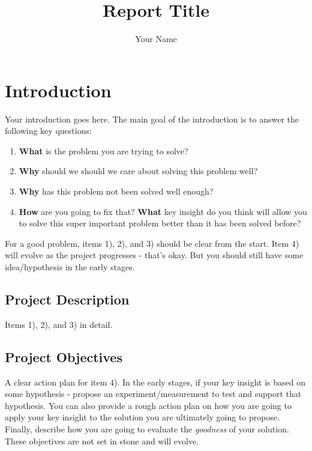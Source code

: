 \documentclass[hyp]{socreport}
\begin{document}
\title{Report Title}
\author{Your Name}

\maketitle

\tableofcontents 

\chapter{Introduction}
\label{intro}

Your introduction goes here. The main goal of the introduction is to answer the following key questions:
\begin{enumerate}
    \item \textbf{What} is the problem you are trying to solve?
    \item \textbf{Why} should we should we care about solving this problem well?
    \item \textbf{Why} has this problem not been solved well enough?
    \item \textbf{How} are you going to fix that? \textbf{What} key insight do you think will allow you to solve this super important problem better than it has been solved before?
\end{enumerate}

For a good problem, items 1), 2), and 3) should be clear from the start. Item 4) will evolve as the project progresses - that's okay. But you should still have some idea/hypothesis in the early stages.

\section{Project Description}

Items 1), 2), and 3) in detail.

\section{Project Objectives}

A clear action plan for item 4). In the early stages, if your key insight is based on some hypothesis - propose an experiment/measurement to test and support that hypothesis.
You can also provide a rough action plan on how you are going to apply your key insight to the solution you are ultimately going to propose. Finally, describe how you are going to evaluate the {\em goodness} of your solution. These objectives are not set in stone and will evolve.
\end{document}
